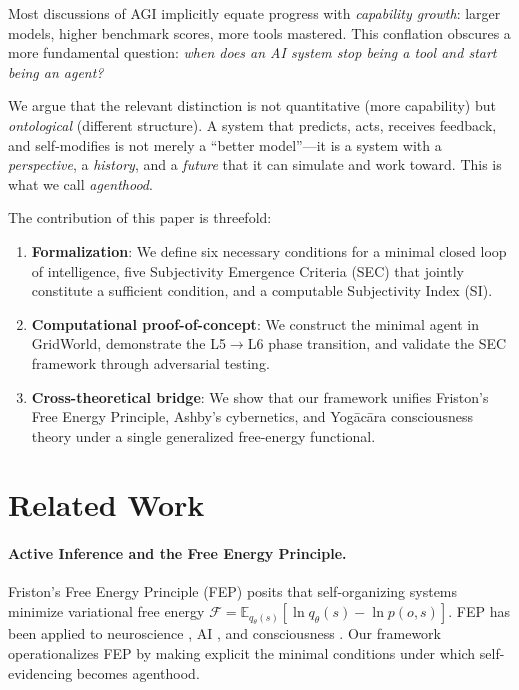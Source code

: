 \documentclass[11pt,a4paper]{article}
\begin{document}
Most discussions of AGI implicitly equate progress with \emph{capability growth}: larger models, higher benchmark scores, more tools mastered. This conflation obscures a more fundamental question: \emph{when does an AI system stop being a tool and start being an agent?}

We argue that the relevant distinction is not quantitative (more capability) but \emph{ontological} (different structure). A system that predicts, acts, receives feedback, and self-modifies is not merely a ``better model''---it is a system with a \emph{perspective}, a \emph{history}, and a \emph{future} that it can simulate and work toward. This is what we call \emph{agenthood}.

The contribution of this paper is threefold:

\begin{enumerate}
    \item \textbf{Formalization}: We define six necessary conditions for a minimal closed loop of intelligence, five Subjectivity Emergence Criteria (SEC) that jointly constitute a sufficient condition, and a computable Subjectivity Index (SI).
    \item \textbf{Computational proof-of-concept}: We construct the minimal agent in GridWorld, demonstrate the L5$\to$L6 phase transition, and validate the SEC framework through adversarial testing.
    \item \textbf{Cross-theoretical bridge}: We show that our framework unifies Friston's Free Energy Principle, Ashby's cybernetics, and Yog\={a}c\={a}ra consciousness theory under a single generalized free-energy functional.
\end{enumerate}

\section{Related Work}

\paragraph{Active Inference and the Free Energy Principle.}
Friston's Free Energy Principle (FEP) \citep{friston2010free} posits that self-organizing systems minimize variational free energy $\mathcal{F} = \mathbb{E}_{q_\theta(s)}[\ln q_\theta(s) - \ln p(o,s)]$. FEP has been applied to neuroscience \citep{friston2017active}, AI \citep{sajid2021active}, and consciousness \citep{friston2018self}. Our framework operationalizes FEP by making explicit the minimal conditions under which self-evidencing becomes agenthood.
\end{document}
